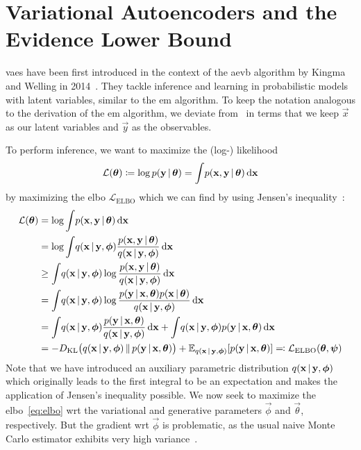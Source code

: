 	\section{Variational Autoencoders and the Evidence Lower Bound}
		\acp{vae} have been first introduced in the context of the \ac{aevb} algorithm by Kingma and Welling in 2014~\cite{kingmaAutoEncodingVariationalBayes2014}. They tackle inference and learning in probabilistic models with latent variables, similar to the \ac{em} algorithm. To keep the notation analogous to the derivation of the \ac{em} algorithm, we deviate from~\cite{kingmaAutoEncodingVariationalBayes2014} in terms that we keep \(\vec{x}\) as our latent variables and \(\vec{y}\) as the observables.

		To perform inference, we want to maximize the (log-) likelihood
		\begin{align*}
			\mathcal{L}(\boldsymbol{\mathrm{\theta}}) \coloneqq \log p(\boldsymbol{\mathrm{y}} \,\vert\, \boldsymbol{\mathrm{\theta}}) = \int\! p(\boldsymbol{\mathrm{x}}, \boldsymbol{\mathrm{y}} \,\vert\, \boldsymbol{\mathrm{\theta}}) \dd{\boldsymbol{\mathrm{x}}}
		\end{align*}
		by maximizing the \ac{elbo} \( \mathcal{L}_\mathrm{ELBO} \) which we can find by using Jensen's inequality~\cite{jensenFonctionsConvexesInegalites1906}:
		\begin{align}
			\mathcal{L}(\boldsymbol{\mathrm{\theta}})
				&= \log \int\! p(\boldsymbol{\mathrm{x}}, \boldsymbol{\mathrm{y}} \,\vert\, \boldsymbol{\mathrm{\theta}}) \dd{\boldsymbol{\mathrm{x}}}  \nonumber \\
				&= \log \int\! q(\boldsymbol{\mathrm{x}} \,\vert\, \boldsymbol{\mathrm{y}}, \boldsymbol{\mathrm{\phi}}) \frac{p(\boldsymbol{\mathrm{x}}, \boldsymbol{\mathrm{y}} \,\vert\, \boldsymbol{\mathrm{\theta}})}{q(\boldsymbol{\mathrm{x}} \,\vert\, \boldsymbol{\mathrm{y}}, \boldsymbol{\mathrm{\phi}})} \dd{\boldsymbol{\mathrm{x}}}  \nonumber \\
				&\geq \int\! q(\boldsymbol{\mathrm{x}} \,\vert\, \boldsymbol{\mathrm{y}}, \boldsymbol{\mathrm{\phi}}) \log \frac{p(\boldsymbol{\mathrm{x}}, \boldsymbol{\mathrm{y}} \,\vert\, \boldsymbol{\mathrm{\theta}})}{q(\boldsymbol{\mathrm{x}} \,\vert\, \boldsymbol{\mathrm{y}}, \boldsymbol{\mathrm{\phi}})} \dd{\boldsymbol{\mathrm{x}}}  \nonumber \\
				&= \int\! q(\boldsymbol{\mathrm{x}} \,\vert\, \boldsymbol{\mathrm{y}}, \boldsymbol{\mathrm{\phi}}) \log \frac{p(\boldsymbol{\mathrm{y}} \,\vert\, \boldsymbol{\mathrm{x}}, \boldsymbol{\mathrm{\theta}}) p(\boldsymbol{\mathrm{x}} \,\vert\, \boldsymbol{\mathrm{\theta}})}{q(\boldsymbol{\mathrm{x}} \,\vert\, \boldsymbol{\mathrm{y}}, \boldsymbol{\mathrm{\phi}})} \dd{\boldsymbol{\mathrm{x}}}  \nonumber \\
				&= \int\! q(\boldsymbol{\mathrm{x}} \,\vert\, \boldsymbol{\mathrm{y}}, \boldsymbol{\mathrm{\phi}}) \frac{p(\boldsymbol{\mathrm{y}} \,\vert\, \boldsymbol{\mathrm{x}}, \boldsymbol{\mathrm{\theta}})}{q(\boldsymbol{\mathrm{x}} \,\vert\, \boldsymbol{\mathrm{y}}, \boldsymbol{\mathrm{\phi}})} \dd{\boldsymbol{\mathrm{x}}} + \int\! q(\boldsymbol{\mathrm{x}} \,\vert\, \boldsymbol{\mathrm{y}}, \boldsymbol{\mathrm{\phi}}) p(\boldsymbol{\mathrm{y}} \,\vert\, \boldsymbol{\mathrm{x}}, \boldsymbol{\mathrm{\theta}}) \dd{\boldsymbol{\mathrm{x}}}  \nonumber \\
				&= -D_\mathrm{KL}\big( q(\boldsymbol{\mathrm{x}} \,\vert\, \boldsymbol{\mathrm{y}}, \boldsymbol{\mathrm{\phi}}) \,\Vert\, p(\boldsymbol{\mathrm{y}} \,\vert\, \boldsymbol{\mathrm{x}}, \boldsymbol{\mathrm{\theta}}) \big) + \mathbb{E}_{q(\boldsymbol{\mathrm{x}} \,\vert\, \boldsymbol{\mathrm{y}}, \boldsymbol{\mathrm{\phi}})}[p(\boldsymbol{\mathrm{y}} \,\vert\, \boldsymbol{\mathrm{x}}, \boldsymbol{\mathrm{\theta}})] \eqqcolon \mathcal{L}_\mathrm{ELBO}(\boldsymbol{\mathrm{\theta}}, \boldsymbol{\mathrm{\psi}})  \label{eq:elbo}
		\end{align}
		Note that we have introduced an auxiliary parametric distribution \( q(\boldsymbol{\mathrm{x}} \,\vert\, \boldsymbol{\mathrm{y}}, \boldsymbol{\mathrm{\phi}}) \) which originally leads to the first integral to be an expectation and makes the application of Jensen's inequality possible. We now seek to maximize the \ac{elbo}~\eqref{eq:elbo} \ac{wrt} the variational and generative parameters \(\vec{\phi}\) and \(\vec{\theta}\), respectively. But the gradient \ac{wrt} \(\vec{\phi}\) is problematic, as the usual naive Monte Carlo estimator exhibits very high variance~\cite{kingmaAutoEncodingVariationalBayes2014,paisleyVariationalBayesianInference2012a}.

